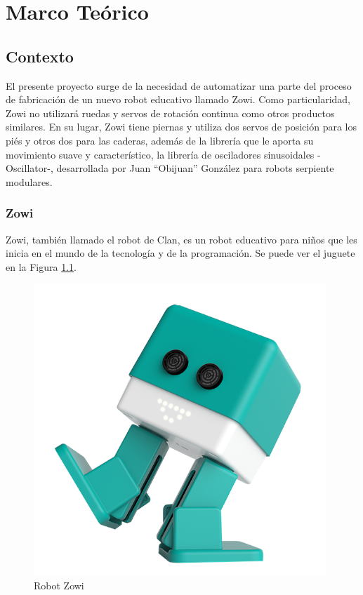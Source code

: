 
\chapter{Marco Teórico} %

\label{Chapter2} %


\section{Contexto}

El presente proyecto surge de la necesidad de automatizar una parte del proceso de fabricación de un nuevo robot educativo llamado Zowi. Como particularidad, Zowi no utilizará ruedas y servos de rotación continua como otros productos similares. En su lugar, Zowi tiene piernas y utiliza dos servos de posición para los piés y otros dos para las caderas, además de la librería que le aporta su movimiento suave y característico, la librería de osciladores sinusoidales -Oscillator-, desarrollada por Juan ``Obijuan'' González para robots serpiente modulares.

\subsection{Zowi}
Zowi, también llamado el robot de Clan, es un robot educativo para niños que les inicia en el mundo de la tecnología y de la programación. Se puede ver el juguete en la Figura \ref{fig:Zowi-img}.

\begin{figure}[h]
\centering
\includegraphics[width=110mm]{Figures/zowi-img.png}
\caption[Robot Zowi]{Robot Zowi}
\label{fig:Zowi-img}
\end{figure}

